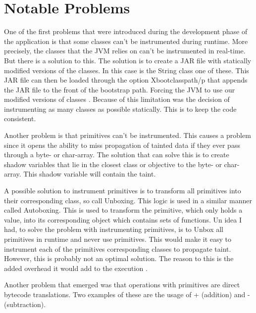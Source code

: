 \section{Notable Problems}
\label{NotableProblems}
One of the first problems that were introduced during the development phase of the application is that some classes can't be instrumented during runtime. More precisely, the classes that the JVM relies on can't be instrumented in real-time. But there is a solution to this. The solution is to create a JAR file with statically modified versions of the classes. In this case is the String class one of these. This JAR file can then be loaded through the option Xbootclasspath/p that appends the JAR file to the front of the bootstrap path. Forcing the JVM to use our modified versions of classes \parencite{xboot}. Because of this limitation was the decision of instrumenting as many classes as possible statically. This is to keep the code consistent.

Another problem is that primitives can't be instrumented. This causes a problem since it opens the ability to miss propagation of tainted data if they ever pass through a byte- or char-array. The solution that can solve this is to create shadow variables that lie in the closest class or objective to the byte- or char-array. This shadow variable will contain the taint.

A possible solution to instrument primitives is to transform all primitives into their corresponding class, so call Unboxing. This logic is used in a similar manner called Autoboxing. This is used to transform the primitive, which only holds a value, into its corresponding object which contains sets of functions. Un idea I had, to solve the problem with instrumenting primitives, is to Unbox all primitives in runtime and never use primitives. This would make it easy to instrument each of the primitives corresponding classes to propagate taint. However, this is probably not an optimal solution. The reason to this is the added overhead it would add to the execution \parencite{BlochJoshua2008EJ}. 

Another problem that emerged was that operations with primitives are direct bytecode translations. Two examples of these are the usage of + (addition) and - (subtraction).

